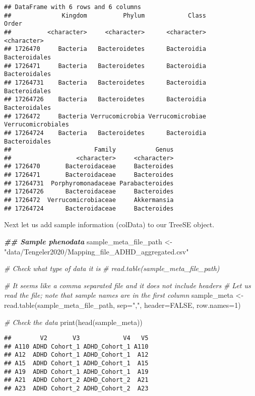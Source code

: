\documentclass[
  oneside]{book}
\newenvironment{Shaded}{\begin{snugshade}}{\end{snugshade}}
\newcommand{\AttributeTok}[1]{\textcolor[rgb]{0.77,0.63,0.00}{#1}}
\newcommand{\CommentTok}[1]{\textcolor[rgb]{0.56,0.35,0.01}{\textit{#1}}}
\newcommand{\ConstantTok}[1]{\textcolor[rgb]{0.00,0.00,0.00}{#1}}
\newcommand{\DecValTok}[1]{\textcolor[rgb]{0.00,0.00,0.81}{#1}}
\newcommand{\DocumentationTok}[1]{\textcolor[rgb]{0.56,0.35,0.01}{\textbf{\textit{#1}}}}
\newcommand{\FunctionTok}[1]{\textcolor[rgb]{0.00,0.00,0.00}{#1}}
\newcommand{\NormalTok}[1]{#1}
\newcommand{\OtherTok}[1]{\textcolor[rgb]{0.56,0.35,0.01}{#1}}
\newcommand{\StringTok}[1]{\textcolor[rgb]{0.31,0.60,0.02}{#1}}
\begin{document}
\begin{verbatim}
## DataFrame with 6 rows and 6 columns
##              Kingdom          Phylum            Class              Order
##          <character>     <character>      <character>        <character>
## 1726470     Bacteria   Bacteroidetes      Bacteroidia      Bacteroidales
## 1726471     Bacteria   Bacteroidetes      Bacteroidia      Bacteroidales
## 17264731    Bacteria   Bacteroidetes      Bacteroidia      Bacteroidales
## 17264726    Bacteria   Bacteroidetes      Bacteroidia      Bacteroidales
## 1726472     Bacteria Verrucomicrobia Verrucomicrobiae Verrucomicrobiales
## 17264724    Bacteria   Bacteroidetes      Bacteroidia      Bacteroidales
##                       Family           Genus
##                  <character>     <character>
## 1726470       Bacteroidaceae     Bacteroides
## 1726471       Bacteroidaceae     Bacteroides
## 17264731  Porphyromonadaceae Parabacteroides
## 17264726      Bacteroidaceae     Bacteroides
## 1726472  Verrucomicrobiaceae     Akkermansia
## 17264724      Bacteroidaceae     Bacteroides
\end{verbatim}

Next let us add sample information (colData) to our TreeSE object.

\begin{Shaded}
\begin{Highlighting}[]
\DocumentationTok{\#\# Sample phenodata}
\NormalTok{sample\_meta\_file\_path }\OtherTok{\textless{}{-}} \StringTok{"data/Tengeler2020/Mapping\_file\_ADHD\_aggregated.csv"}

\CommentTok{\# Check what type of data it is}
\CommentTok{\# read.table(sample\_meta\_file\_path)}

\CommentTok{\# It seems like a comma separated file and it does not include headers}
\CommentTok{\# Let us read the file; note that sample names are in the first column}
\NormalTok{sample\_meta }\OtherTok{\textless{}{-}} \FunctionTok{read.table}\NormalTok{(sample\_meta\_file\_path, }\AttributeTok{sep=}\StringTok{","}\NormalTok{, }\AttributeTok{header=}\ConstantTok{FALSE}\NormalTok{, }\AttributeTok{row.names=}\DecValTok{1}\NormalTok{)}

\CommentTok{\# Check the data}
\FunctionTok{print}\NormalTok{(}\FunctionTok{head}\NormalTok{(sample\_meta))}
\end{Highlighting}
\end{Shaded}

\begin{verbatim}
##        V2       V3            V4   V5
## A110 ADHD Cohort_1 ADHD_Cohort_1 A110
## A12  ADHD Cohort_1 ADHD_Cohort_1  A12
## A15  ADHD Cohort_1 ADHD_Cohort_1  A15
## A19  ADHD Cohort_1 ADHD_Cohort_1  A19
## A21  ADHD Cohort_2 ADHD_Cohort_2  A21
## A23  ADHD Cohort_2 ADHD_Cohort_2  A23
\end{verbatim}
\end{document}

